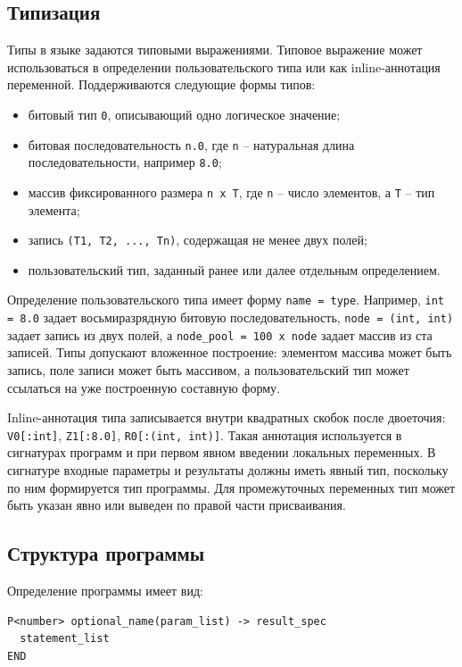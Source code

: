 \subsection{Типизация}
Типы в языке задаются типовыми выражениями.
Типовое выражение может использоваться в определении пользовательского типа или как inline-аннотация переменной.
Поддерживаются следующие формы типов:
\begin{itemize}
	\item битовый тип \texttt{0}, описывающий одно логическое значение;
	\item битовая последовательность \texttt{n.0}, где \texttt{n} -- натуральная длина последовательности, например \texttt{8.0};
	\item массив фиксированного размера \texttt{n x T}, где \texttt{n} -- число элементов, а \texttt{T} -- тип элемента;
	\item запись \texttt{(T1, T2, ..., Tn)}, содержащая не менее двух полей;
	\item пользовательский тип, заданный ранее или далее отдельным определением.
\end{itemize}

Определение пользовательского типа имеет форму \texttt{name = type}.
Например, \texttt{int = 8.0} задает восьмиразрядную битовую последовательность, \texttt{node = (int, int)} задает запись из двух полей, а \texttt{node\_pool = 100 x node} задает массив из ста записей.
Типы допускают вложенное построение: элементом массива может быть запись, поле записи может быть массивом, а пользовательский тип может ссылаться на уже построенную составную форму.

Inline-аннотация типа записывается внутри квадратных скобок после двоеточия: \texttt{V0[:int]}, \texttt{Z1[:8.0]}, \texttt{R0[:(int, int)]}.
Такая аннотация используется в сигнатурах программ и при первом явном введении локальных переменных.
В сигнатуре входные параметры и результаты должны иметь явный тип, поскольку по ним формируется тип программы.
Для промежуточных переменных тип может быть указан явно или выведен по правой части присваивания.

\subsection{Структура программы}
Определение программы имеет вид:
\begin{verbatim}
P<number> optional_name(param_list) -> result_spec
  statement_list
END
\end{verbatim}

